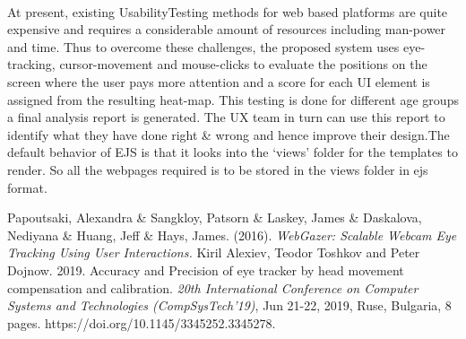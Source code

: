 \documentclass[12pt,a4paper,final]{extreport}
\begin{document}
\paragraph{}
At present, existing Usability\-Testing methods for web based platforms are quite expensive and requires a considerable amount of resources including man-power and time.
Thus to overcome these challenges, the proposed system uses eye-tracking, cursor-movement and mouse-clicks to evaluate the positions on the screen where the user pays more attention and a score for each UI element is assigned from the resulting heat-map.
This testing is done for different age groups a final analysis report is generated. The UX team in turn can use this report to identify what they have done right \& wrong and hence improve their design.The default behavior of EJS is that it looks into the ‘views’ folder for the templates to render. So all the webpages required is to be stored in the views folder in ejs format.


\newpage
{}
\vspace{0.3cm}
\begin{thebibliography}{}
    Papoutsaki, Alexandra \& Sangkloy, Patsorn \& Laskey, James \& Daskalova, Nediyana \& Huang, Jeff \& Hays, James. (2016). \emph{WebGazer: Scalable Webcam Eye Tracking Using User Interactions.}
    Kiril Alexiev, Teodor Toshkov and Peter Dojnow. 2019. Accuracy and Precision of eye tracker by head movement compensation and calibration. \emph{20th International Conference on Computer Systems and Technologies
    (CompSysTech'19)}, Jun 21-22, 2019, Ruse, Bulgaria, 8 pages.
    https://doi.org/10.1145/3345252.3345278.

\end{thebibliography}
\end{document}
